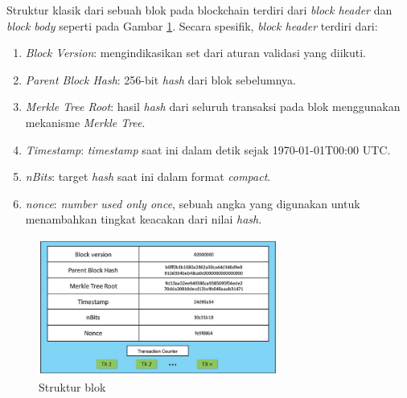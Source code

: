 Struktur klasik dari sebuah blok pada blockchain terdiri dari \textit{block header} dan \textit{block body} seperti pada Gambar \ref{image:struktur-blok}. Secara spesifik, \textit{block header} terdiri dari:

\begin{enumerate}
	\item \textit{Block Version}: mengindikasikan set dari aturan validasi yang diikuti.
	\item \textit{Parent Block Hash}: 256-bit \textit{hash} dari blok sebelumnya.
	\item \textit{Merkle Tree Root}: hasil \textit{hash} dari seluruh transaksi pada blok menggunakan mekanisme \textit{Merkle Tree}.
	\item \textit{Timestamp}: \textit{timestamp} saat ini dalam detik sejak 1970-01-01T00:00 UTC.
	\item \textit{nBits}: target \textit{hash} saat ini dalam format \textit{compact}.
	\item \textit{nonce}: \textit{number used only once}, sebuah angka yang digunakan untuk menambahkan tingkat keacakan dari nilai \textit{hash}.
\end{enumerate}

\begin{figure}[ht]
	\centering
	\includegraphics[width=0.7\textwidth]{resources/chapter-2/struktur-block.png}
	\caption{Struktur blok \parencite{zheng2018blockchain}}
	\label{image:struktur-blok}
\end{figure}